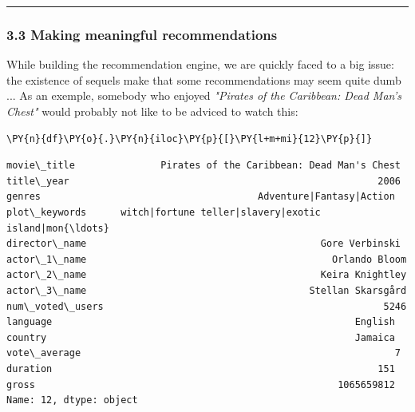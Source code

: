     \begin{center}\rule{0.5\linewidth}{\linethickness}\end{center}

\subsubsection{3.3 Making meaningful
recommendations}\label{making-meaningful-recommendations}

    While building the recommendation engine, we are quickly faced to a big
issue: the existence of sequels make that some recommendations may seem
quite dumb ... As an exemple, somebody who enjoyed \emph{"Pirates of the
Caribbean: Dead Man's Chest"} would probably not like to be adviced to
watch this:

    \begin{tcolorbox}[breakable, size=fbox, boxrule=1pt, pad at break*=1mm,colback=cellbackground, colframe=cellborder]
\begin{Verbatim}[commandchars=\\\{\}]
\PY{n}{df}\PY{o}{.}\PY{n}{iloc}\PY{p}{[}\PY{l+m+mi}{12}\PY{p}{]}
\end{Verbatim}
\end{tcolorbox}

            \begin{tcolorbox}[breakable, boxrule=.5pt, size=fbox, pad at break*=1mm, opacityfill=0]
\begin{Verbatim}[commandchars=\\\{\}]
movie\_title               Pirates of the Caribbean: Dead Man's Chest
title\_year                                                      2006
genres                                      Adventure|Fantasy|Action
plot\_keywords      witch|fortune teller|slavery|exotic island|mon{\ldots}
director\_name                                         Gore Verbinski
actor\_1\_name                                           Orlando Bloom
actor\_2\_name                                         Keira Knightley
actor\_3\_name                                       Stellan Skarsgård
num\_voted\_users                                                 5246
language                                                     English
country                                                      Jamaica
vote\_average                                                       7
duration                                                         151
gross                                                     1065659812
Name: 12, dtype: object
\end{Verbatim}
\end{tcolorbox}
        
